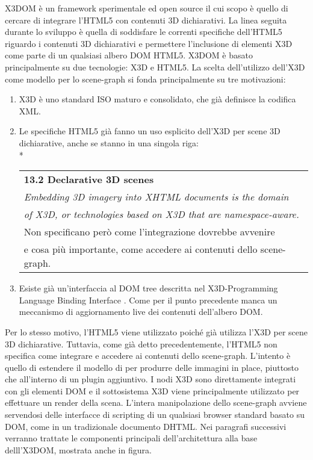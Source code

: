 X3DOM è un framework sperimentale ed open source il cui scopo è quello di cercare di integrare l'HTML5 con contenuti 3D dichiarativi. 
La linea seguita durante lo sviluppo è quella di soddisfare le correnti specifiche dell'HTML5 riguardo i contenuti 3D dichiarativi\cite{W3C-d} e 
permettere l'inclusione di elementi X3D come parte di un qualsiasi albero DOM HTML5. X3DOM è basato principalmente su due tecnologie: X3D e HTML5.
La scelta dell'utilizzo dell'X3D come modello per lo scene-graph si fonda principalmente su tre motivazioni:
\begin{enumerate}
	\item X3D è uno standard ISO maturo e consolidato, che già definisce la codifica XML.
	\item Le specifiche HTML5 già fanno un uso esplicito dell'X3D per scene 3D dichiarative, anche se stanno in una singola riga:
		\\*
		\begin{tabular}{l}
		\bfseries 13.2 Declarative 3D scenes\\*
		\textit{Embedding 3D imagery into XHTML documents is the domain} \\*
		\textit{of X3D, or technologies based on X3D that are namespace-aware.}\\*
		Non specificano però come l'integrazione dovrebbe avvenire\\*
		e cosa più importante, come accedere ai contenuti dello scene-graph.\\*
		\end{tabular}
	\item Esiste già un'interfaccia al DOM tree descritta nel X3D-Programming Language Binding Interface \cite{Web3DConsortium-c}. Come per il punto precedente 
			manca un meccanismo di aggiornamento live dei contenuti dell'albero DOM.
\end{enumerate}
Per lo stesso motivo, l'HTML5 viene utilizzato poiché già utilizza l'X3D per scene 3D dichiarative. Tuttavia, come già detto precedentemente, 
l'HTML5 non specifica come integrare e accedere ai contenuti dello scene-graph. L'intento è quello di estendere il modello di per produrre delle 
immagini in place, piuttosto che all'interno di un plugin aggiuntivo. I nodi X3D sono direttamente integrati con gli elementi DOM e il sottosistema
X3D viene principalmente utilizzato per effettuare un render della scena. L'intera manipolazione dello scene-graph avviene servendosi delle interfacce 
di scripting di un qualsiasi browser standard basato su DOM, come in un tradizionale documento DHTML.
Nei paragrafi successivi verranno trattate le componenti principali dell'architettura alla base delll'X3DOM, mostrata anche in figura.

